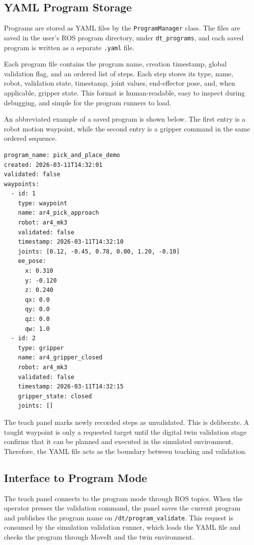 \subsection{YAML Program Storage}

Programs are stored as YAML files by the \texttt{ProgramManager} class. The files are saved in the user's ROS program directory, under \texttt{dt\_programs}, and each saved program is written as a separate \texttt{.yaml} file.

Each program file contains the program name, creation timestamp, global validation flag, and an ordered list of steps. Each step stores its type, name, robot, validation state, timestamp, joint values, end-effector pose, and, when applicable, gripper state. This format is human-readable, easy to inspect during debugging, and simple for the program runners to load.

An abbreviated example of a saved program is shown below. The first entry is a robot motion waypoint, while the second entry is a gripper command in the same ordered sequence.

\newpage

\begin{Verbatim}[fontsize=\small, frame=single]
program_name: pick_and_place_demo
created: 2026-03-11T14:32:01
validated: false
waypoints:
  - id: 1
    type: waypoint
    name: ar4_pick_approach
    robot: ar4_mk3
    validated: false
    timestamp: 2026-03-11T14:32:10
    joints: [0.12, -0.45, 0.78, 0.00, 1.20, -0.10]
    ee_pose:
      x: 0.310
      y: -0.120
      z: 0.240
      qx: 0.0
      qy: 0.0
      qz: 0.0
      qw: 1.0
  - id: 2
    type: gripper
    name: ar4_gripper_closed
    robot: ar4_mk3
    validated: false
    timestamp: 2026-03-11T14:32:15
    gripper_state: closed
    joints: []
\end{Verbatim}

The teach panel marks newly recorded steps as unvalidated. This is deliberate. A taught waypoint is only a requested target until the digital twin validation stage confirms that it can be planned and executed in the simulated environment. Therefore, the YAML file acts as the boundary between teaching and validation.

\subsection{Interface to Program Mode}

The teach panel connects to the program mode through ROS topics. When the operator presses the validation command, the panel saves the current program and publishes the program name on \texttt{/dt/program\_validate}. This request is consumed by the simulation validation runner, which loads the YAML file and checks the program through MoveIt and the twin environment.

